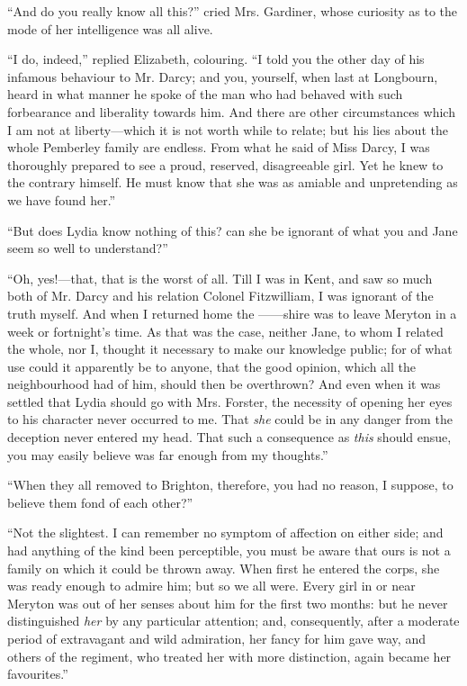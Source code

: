 \documentclass[12pt]{book}
\begin{document}
``And do you really know all this?'' cried Mrs. Gardiner, whose curiosity as to the mode of her intelligence was all alive.

``I do, indeed,'' replied Elizabeth, colouring. ``I told you the other day of his infamous behaviour to Mr. Darcy; and you, yourself, when last at Longbourn, heard in what manner he spoke of the man who had behaved with such forbearance and liberality towards him. And there are other circumstances which I am not at liberty---which it is not worth while to relate; but his lies about the whole Pemberley family are endless. From what he said of Miss Darcy, I was thoroughly prepared to see a proud, reserved, disagreeable girl. Yet he knew to the contrary himself. He must know that she was as amiable and unpretending as we have found her.''

``But does Lydia know nothing of this? can she be ignorant of what you and Jane seem so well to understand?''

``Oh, yes!---that, that is the worst of all. Till I was in Kent, and saw so much both of Mr. Darcy and his relation Colonel Fitzwilliam, I was ignorant of the truth myself. And when I returned home the ------shire was to leave Meryton in a week or fortnight's time. As that was the case, neither Jane, to whom I related the whole, nor I, thought it necessary to make our knowledge public; for of what use could it apparently be to anyone, that the good opinion, which all the neighbourhood had of him, should then be overthrown? And even when it was settled that Lydia should go with Mrs. Forster, the necessity of opening her eyes to his character never occurred to me. That \textit{she} could be in any danger from the deception never entered my head. That such a consequence as \textit{this} should ensue, you may easily believe was far enough from my thoughts.''

``When they all removed to Brighton, therefore, you had no reason, I suppose, to believe them fond of each other?''

``Not the slightest. I can remember no symptom of affection on either side; and had anything of the kind been perceptible, you must be aware that ours is not a family on which it could be thrown away. When first he entered the corps, she was ready enough to admire him; but so we all were. Every girl in or near Meryton was out of her senses about him for the first two months: but he never distinguished \textit{her} by any particular attention; and, consequently, after a moderate period of extravagant and wild admiration, her fancy for him gave way, and others of the regiment, who treated her with more distinction, again became her favourites.''
\end{document}
